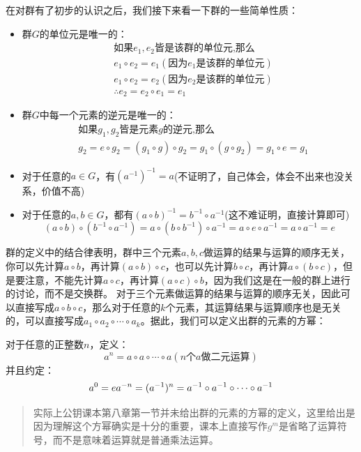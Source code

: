\documentclass[12pt, a4paper, oneside]{ctexart}
\newenvironment{myquote}{\begin{quote}\small\color{gray}}{\end{quote}}
\begin{document}
在对群有了初步的认识之后，我们接下来看一下群的一些简单性质：

\begin{itemize}[leftmargin=*]
\item 群$G$的单位元是唯一的：
\[
\begin{aligned}
&\mbox{如果}e_1,e_2\mbox{皆是该群的单位元,那么}\\
&e_1\circ e_2=e_1(\mbox{因为}e_1\mbox{是该群的单位元})\\
&e_1\circ e_2=e_2(\mbox{因为}e_2\mbox{是该群的单位元})\\
&\therefore e_2=e_2\circ e_1=e_1
\end{aligned}
\]
\item 群$G$中每一个元素的逆元是唯一的：
\[
\begin{aligned}
&\mbox{如果}g_1,g_2\mbox{皆是元素}g\mbox{的逆元,那么}\\
&g_2=e\circ g_2=(g_1\circ g)\circ g_2=g_1\circ(g\circ g_2)=g_1\circ e=g_1
\end{aligned}
\]
\item 对于任意的$a\in G$，有$(a^{-1})^{-1}=a$(不证明了，自己体会，体会不出来也没关系，价值不高)
\item 对于任意的$a,b\in G$，都有$(a\circ b)^{-1}=b^{-1}\circ a^{-1}$(这不难证明，直接计算即可)
\[
(a\circ b)\circ(b^{-1}\circ a^{-1})=a\circ (b\circ b^{-1})\circ a^{-1}=a\circ e\circ a^{-1}=a\circ a^{-1}=e
\]
\end{itemize}

群的定义中的结合律表明，群中三个元素$a,b,c$做运算的结果与运算的顺序无关，你可以先计算$a\circ b$，再计算$(a\circ b)\circ c$，也可以先计算$b\circ c$，再计算$a\circ(b\circ c)$，但是要注意，不能先计算$a\circ c$，再计算$(a\circ c)\circ b$，因为我们这是在一般的群上进行的讨论，而不是交换群。
对于三个元素做运算的结果与运算的顺序无关，因此可以直接写成$a\circ b\circ c$，那么对于任意的$k$个元素，其运算结果与运算顺序也是无关的，可以直接写成$a_1\circ a_2\circ \cdots\circ a_k$。据此，我们可以定义出群的元素的方幂：

对于任意的正整数$n$，定义：
\[
a^n=a\circ a\circ \cdots \circ a(n\mbox{个}a\mbox{做二元运算})
\]
并且约定：
\[
a^0=e\\
a^{-n}=(a^{-1})^n=a^{-1}\circ a^{-1}\circ \cdots\circ a^{-1}
\]

\begin{myquote}
实际上公钥课本第八章第一节并未给出群的元素的方幂的定义，这里给出是因为理解这个方幂确实是十分的重要，课本上直接写作$g^m$是省略了运算符号，而不是意味着运算就是普通乘法运算。
\end{myquote}
\end{document}
